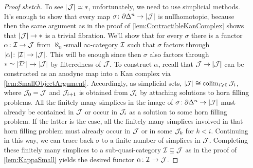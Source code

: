 \begin{proof}[Proof sketch]
	To see $\abs{\Jj}\simeq *$, unfortunately, we need to use simplicial methods. It's enough to show that every map $\sigma\colon \partial\Delta^n\rightarrow\abs{\Jj}$ is nullhomotopic, because then the same argument as in the proof of \cref{lem:ContractibleKanComplex} shows that $\abs{\Jj}\rightarrow*$ is a trivial fibration. We'll show that for every $\sigma$ there is a functor $\alpha\colon\mathcal{I}\rightarrow \mathcal{J}$ from $\aleph_0$-small $\infty$-category $\mathcal{I}$ such that $\sigma$ factors through $\abs{\alpha}\colon\abs{\Ii}\rightarrow \abs{\Jj}$. This will be enough since then $\sigma$ also factors through $*\simeq \abs{\Ii^\triangleright}\rightarrow\abs{\Jj}$ by filteredness of $\mathcal{J}$. To construct $\alpha$, recall that $\Jj\rightarrow\abs{\Jj}$ can be constructed as an anodyne map into a Kan complex via \cref{lem:SmallObjectArgument}. Accordingly, as simplicial sets, $\abs{\Jj}\cong \colimit_{i\geqslant 0}\Jj_i$, where $\mathcal{J}_0=\mathcal{J}$ and $\mathcal{J}_{i+1}$ is obtained from $\mathcal{J}_i$ by attaching solutions to horn filling problems. All the finitely many simplices in the image of $\sigma\colon\partial\Delta^n\rightarrow\abs{\Jj}$ must already be contained in $\mathcal{J}$ or occur in $\mathcal{J}_i$ as a solution to some horn filling problem. If the latter is the case, all the finitely many simplices involved in that horn filling problem must already occur in $\mathcal{J}$ or in some $\mathcal{J}_k$ for $k<i$. Continuing in this way, we can trace back $\sigma$ to a finite number of simplices in $\mathcal{J}$. Completing these finitely many simplices to a sub-quasi-category $\mathcal{I}\subseteq\mathcal{J}$ as in the proof of \cref{lem:KappaSmall} yields the desired functor $\alpha\colon \mathcal{I}\rightarrow\mathcal{J}$. %
	

\end{proof}
